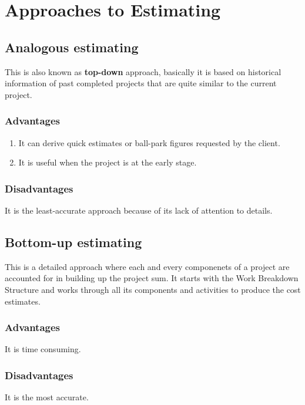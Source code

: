 \documentclass[math,code]{amznotes}
\theoremstyle{remark}
\begin{document}
\section{Approaches to Estimating}
\subsection{Analogous estimating}
This is also known as \textbf{top-down} approach, basically it is based on historical information of past completed projects that are quite similar to the current project.
\subsubsection{Advantages}
\begin{enumerate}
    \item It can derive quick estimates or ball-park figures requested by the client.
    \item It is useful when the project is at the early stage.
\end{enumerate}
\subsubsection{Disadvantages}
It is the least-accurate approach because of its lack of attention to details.

\subsection{Bottom-up estimating}
This is a detailed approach where each and every componenets of a project are accounted for in building up the project sum. It starts with the Work Breakdown Structure and works through all its components and activities to produce the cost estimates.
\subsubsection{Advantages}
It is time consuming.
\subsubsection{Disadvantages}
It is the most accurate.
\end{document}

